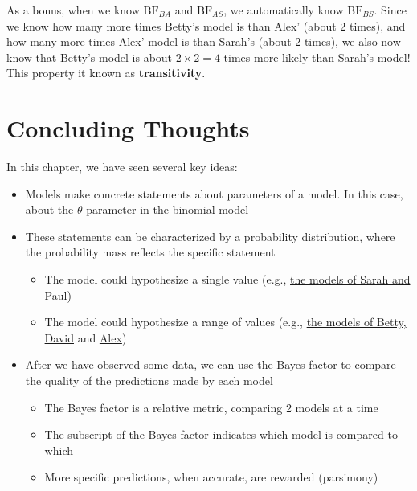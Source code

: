 \documentclass[
  letterpaper,
  DIV=11,
  numbers=noendperiod]{scrreprt}
\providecommand{\tightlist}{%
  \setlength{\itemsep}{0pt}\setlength{\parskip}{0pt}}\usepackage{longtable,booktabs,array}
\begin{document}
As a bonus, when we know \(\text{BF}_{BA}\) and \(\text{BF}_{AS}\), we
automatically know \(\text{BF}_{BS}\). Since we know how many more times
Betty's model is than Alex' (about 2 times), and how many more times
Alex' model is than Sarah's (about 2 times), we also now know that
Betty's model is about \(2 \times 2 = 4\) times more likely than Sarah's
model! This property it known as \textbf{transitivity}.

\hypertarget{concluding-thoughts}{%
\section{Concluding Thoughts}\label{concluding-thoughts}}

In this chapter, we have seen several key ideas:

\begin{itemize}
\tightlist
\item
  Models make concrete statements about parameters of a model. In this
  case, about the \(\theta\) parameter in the binomial model
\item
  These statements can be characterized by a probability distribution,
  where the probability mass reflects the specific statement

  \begin{itemize}
  \tightlist
  \item
    The model could hypothesize a single value (e.g.,
    \protect\hyperlink{fig:two-models-binomial}{the models of Sarah and
    Paul})
  \item
    The model could hypothesize a range of values (e.g.,
    \protect\hyperlink{fig:two-models-binomial-onesided}{the models of
    Betty, David} and
    \protect\hyperlink{fig:uninformed-model-binomial-prediction}{Alex})
  \end{itemize}
\item
  After we have observed some data, we can use the Bayes factor to
  compare the quality of the predictions made by each model

  \begin{itemize}
  \tightlist
  \item
    The Bayes factor is a relative metric, comparing 2 models at a time
  \item
    The subscript of the Bayes factor indicates which model is compared
    to which
  \item
    More specific predictions, when accurate, are rewarded (parsimony)
  \end{itemize}
\end{itemize}
\end{document}
